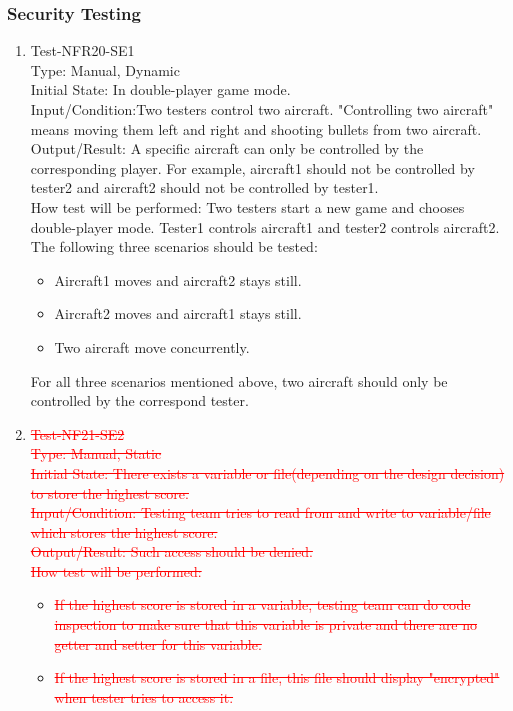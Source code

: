 \documentclass[12pt]{article}
\begin{document}
\subsubsection{Security Testing}
\begin{enumerate}[1.]
\item Test-NFR20-SE1\\
Type: Manual, Dynamic\\
Initial State: In double-player game mode.\\
Input/Condition:Two testers control two aircraft. "Controlling two aircraft" means moving them left and right and shooting bullets 
from two aircraft.\\
Output/Result: A specific aircraft can only 
be controlled by the corresponding player. For example, aircraft1 should not be controlled by 
tester2 and aircraft2 should not be controlled by 
tester1.\\
How test will be performed: Two testers start a 
new game and chooses double-player mode. Tester1 
controls aircraft1 and tester2 controls aircraft2. The following three scenarios should
be tested:
\begin{itemize}
\item Aircraft1 moves and aircraft2 stays still.
\item Aircraft2 moves and aircraft1 stays still.
\item Two aircraft move concurrently.
\end{itemize}
For all three scenarios mentioned above, two 
aircraft should only be controlled by the 
correspond tester.
\item \textcolor{red}{\st{Test-NF21-SE2\\
Type: Manual, Static\\
Initial State: There exists a variable or file(depending on the design decision) to store 
the highest score.\\
Input/Condition: Testing team tries to read from and write to variable/file which stores the highest score.\\
Output/Result: Such access should be denied.\\
How test will be performed: }}
\begin{itemize}

\item \textcolor{red}{\st{If the highest score is stored in a variable,
testing team can do code inspection to make sure 
that this variable is private and there are no
getter and setter for this variable.}}
\item \textcolor{red}{\st{If the highest score is stored in a file, 
this file should display "encrypted" when tester 
tries to access it. }}
\end{itemize}
\end{enumerate}
\end{document}
